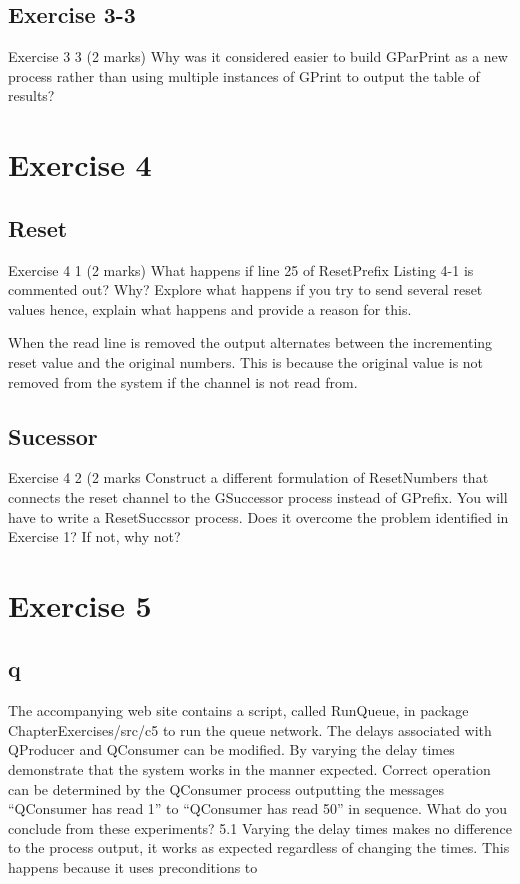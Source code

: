 \documentclass[10pt, a4paper]{article}
\begin{document}
	\subsection{Exercise 3-3}
	
	   Exercise 3 3   (2 marks)
	Why was it considered easier to build GParPrint as a new process rather than using multiple instances of GPrint to output the table of results?
	
	\setcounter{section}{4}
	\section*{Exercise 4}
	
	\setcounter{subsection}{0}
	\subsection{Reset}
	
 Exercise 4 1   (2 marks)
What happens if line {25} of ResetPrefix Listing 4-1 is commented out? Why?
Explore what happens if you try to send several reset values hence, explain what happens and provide a reason for this.
	
	When the read line is removed the output alternates between the incrementing reset value and the original numbers. This is because
	the original value is not removed from the system if the channel is not read from.
	
	\subsection{Sucessor}
	   Exercise 4 2   (2 marks
	Construct a different formulation of ResetNumbers that connects the reset channel to the GSuccessor process instead of GPrefix.  You will have to write a ResetSuccssor process.  Does it overcome the problem identified in Exercise 1? If not, why not?
	
	\setcounter{section}{5}
	\section*{Exercise 5}
	
	\setcounter{subsection}{0}
	\subsection{q}
	
	   The accompanying web site contains a script, called RunQueue, in package ChapterExercises/src/c5 to run the queue network.  The delays associated with QProducer and QConsumer can be modified.  By varying the delay times demonstrate that the system works in the manner expected.  Correct operation can be determined by the QConsumer process outputting the messages “QConsumer has read 1” to “QConsumer has read 50” in sequence.  What do you conclude from these experiments?
	5.1 
	Varying the delay times makes no difference to the process output, it works as expected regardless of changing the times. This happens because it uses preconditions to 
	
\end{document}
